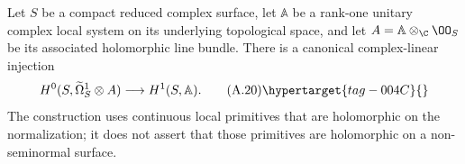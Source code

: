 \begin{proposition}\hypertarget{tag-01AW}{}\label{cdp:st:A.4.7}

Let $S$ be a compact reduced complex surface, let $\mathbb A$ be a rank-one unitary complex local system on its underlying topological space, and let $A=\mathbb A\otimes_{\C}\OO_S$ be its associated holomorphic line bundle. There is a canonical complex-linear injection
\[
 H^0(S,\widetilde\Omega_S^1\otimes A)
       \longrightarrow H^1(S,\mathbb A).
 \tag{A.20}\hypertarget{tag-004C}{}\label{cdp:eq:A.20}
\]
The construction uses continuous local primitives that are holomorphic on the normalization; it does not assert that those primitives are holomorphic on a non-seminormal surface.
\end{proposition}


